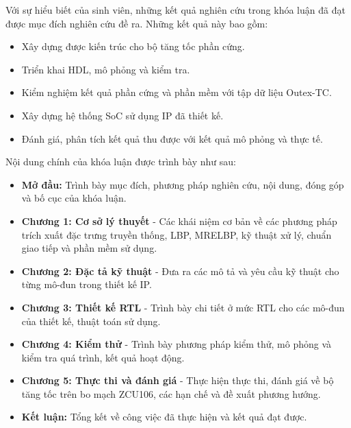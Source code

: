 Với sự hiểu biết của sinh viên, những kết quả nghiên cứu trong khóa luận đã đạt được mục đích nghiên cứu đề ra. Những kết quả này bao gồm:

\renewcommand{\labelitemi}{$-$}
\begin{itemize}
	\item Xây dựng được kiến trúc cho bộ tăng tốc phần cứng.
	\item Triển khai HDL, mô phỏng và kiểm tra.
	\item Kiểm nghiệm kết quả phần cứng và phần mềm với tập dữ liệu Outex-TC.
	\item Xây dựng hệ thống SoC sử dụng IP đã thiết kế.
	\item Đánh giá, phân tích kết quả thu được với kết quả mô phỏng và thực tế.
\end{itemize} 

\vspace{0.5cm}

Nội dung chính của khóa luận được trình bày như sau:

\renewcommand{\labelitemi}{$-$}
\begin{itemize}
	\item \textbf{Mở đầu:} Trình bày mục đích, phương pháp nghiên cứu, nội dung, đóng góp và bố cục của khóa luận.
	\item \textbf{Chương 1: Cơ sở lý thuyết} - Các khái niệm cơ bản về các phương pháp trích xuất đặc trưng truyền thống, LBP, MRELBP, kỹ thuật xử lý, chuẩn giao tiếp và phần mềm sử dụng.
    \item  \textbf{Chương 2: Đặc tả kỹ thuật} - Đưa ra các mô tả và yêu cầu kỹ thuật cho từng mô-đun trong thiết kế IP.
	\item  \textbf{Chương 3: Thiết kế RTL} - Trình bày chi tiết ở mức RTL cho các mô-đun của thiết kế, thuật toán sử dụng.
    
	\item\textbf{Chương 4: Kiểm thử} - Trình bày phương pháp kiểm thử, mô phỏng và kiểm tra quá trình, kết quả hoạt động.
	\item  \textbf{Chương 5: Thực thi và đánh giá} - Thực hiện thực thi, đánh giá về bộ tăng tốc trên bo mạch ZCU106, các hạn chế và đề xuất phương hướng. 
    \item \textbf{Kết luận: }Tổng kết về công việc đã thực hiện và kết quả đạt được.
\end{itemize} 
